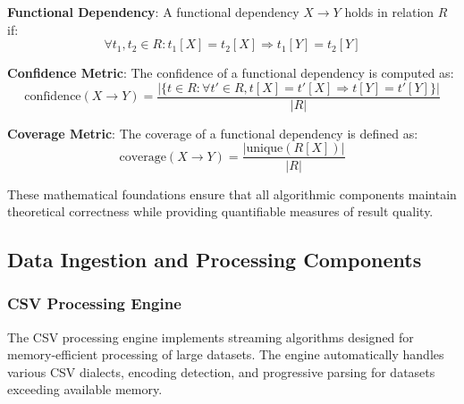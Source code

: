 \documentclass[acmsmall]{acmart}
\begin{document}
\textbf{Functional Dependency}: A functional dependency $X \to Y$ holds in relation $R$ if:
\begin{equation}
\forall t_1, t_2 \in R : t_1[X] = t_2[X] \Rightarrow t_1[Y] = t_2[Y]
\end{equation}

\textbf{Confidence Metric}: The confidence of a functional dependency is computed as:
\begin{equation}
\text{confidence}(X \to Y) = \frac{|\{t \in R : \forall t' \in R, t[X] = t'[X] \Rightarrow t[Y] = t'[Y]\}|}{|R|}
\end{equation}

\textbf{Coverage Metric}: The coverage of a functional dependency is defined as:
\begin{equation}
\text{coverage}(X \to Y) = \frac{|\text{unique}(R[X])|}{|R|}
\end{equation}

These mathematical foundations ensure that all algorithmic components maintain theoretical correctness while providing quantifiable measures of result quality.

\subsection{Data Ingestion and Processing Components}

\subsubsection{CSV Processing Engine}

The CSV processing engine implements streaming algorithms designed for memory-efficient processing of large datasets. The engine automatically handles various CSV dialects, encoding detection, and progressive parsing for datasets exceeding available memory.
\end{document}
